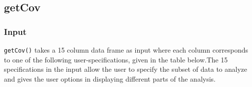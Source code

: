 \documentclass[11pt]{article}\usepackage[]{graphicx}\usepackage[]{color}
\begin{document}
  \subsection{getCov}
  \label{sec:3.1}
  \subsubsection{Input}

  \verb;getCov(); takes a 15 column data frame as input where each column corresponds to one of the following user-specifications, given in the table below.The 15 specifications in the input allow the user to specify the subset of data to analyze and gives the user options in displaying different parts of the analysis.

\end{document}
